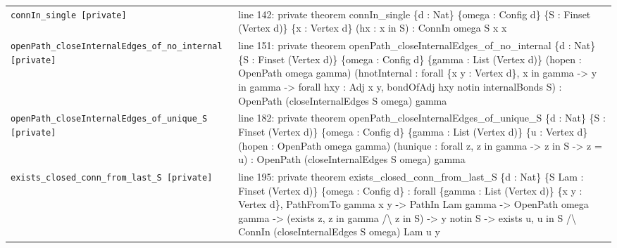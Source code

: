 \documentclass[10pt]{article}
\begin{document}
\begin{longtable}{>{\raggedright\arraybackslash}p{} >{\raggedright\arraybackslash}p{}}
\texttt{connIn\_\allowbreak{}single [private]} & {\ttfamily\scriptsize line 142:\allowbreak{} private theorem connIn\_\allowbreak{}single \{d :\allowbreak{} Nat\} \{omega :\allowbreak{} Config d\} \{S :\allowbreak{} Finset (\allowbreak{}Vertex d)\allowbreak{}\} \{x :\allowbreak{} Vertex d\} (\allowbreak{}hx :\allowbreak{} x in S)\allowbreak{} :\allowbreak{} ConnIn omega S x x} \\[0.45em]
\texttt{openPath\_\allowbreak{}closeInternalEdges\_\allowbreak{}of\_\allowbreak{}no\_\allowbreak{}internal [private]} & {\ttfamily\scriptsize line 151:\allowbreak{} private theorem openPath\_\allowbreak{}closeInternalEdges\_\allowbreak{}of\_\allowbreak{}no\_\allowbreak{}internal \{d :\allowbreak{} Nat\} \{S :\allowbreak{} Finset (\allowbreak{}Vertex d)\allowbreak{}\} \{omega :\allowbreak{} Config d\} \{gamma :\allowbreak{} List (\allowbreak{}Vertex d)\allowbreak{}\} (\allowbreak{}hopen :\allowbreak{} OpenPath omega gamma)\allowbreak{} (\allowbreak{}hnotInternal :\allowbreak{} forall \{x y :\allowbreak{} Vertex d\},\allowbreak{} x in gamma -\allowbreak{}> y in gamma -\allowbreak{}> forall hxy :\allowbreak{} Adj x y,\allowbreak{} bondOfAdj hxy notin internalBonds S)\allowbreak{} :\allowbreak{} OpenPath (\allowbreak{}closeInternalEdges S omega)\allowbreak{} gamma} \\[0.45em]
\texttt{openPath\_\allowbreak{}closeInternalEdges\_\allowbreak{}of\_\allowbreak{}unique\_\allowbreak{}S [private]} & {\ttfamily\scriptsize line 182:\allowbreak{} private theorem openPath\_\allowbreak{}closeInternalEdges\_\allowbreak{}of\_\allowbreak{}unique\_\allowbreak{}S \{d :\allowbreak{} Nat\} \{S :\allowbreak{} Finset (\allowbreak{}Vertex d)\allowbreak{}\} \{omega :\allowbreak{} Config d\} \{gamma :\allowbreak{} List (\allowbreak{}Vertex d)\allowbreak{}\} \{u :\allowbreak{} Vertex d\} (\allowbreak{}hopen :\allowbreak{} OpenPath omega gamma)\allowbreak{} (\allowbreak{}hunique :\allowbreak{} forall z,\allowbreak{} z in gamma -\allowbreak{}> z in S -\allowbreak{}> z =\allowbreak{} u)\allowbreak{} :\allowbreak{} OpenPath (\allowbreak{}closeInternalEdges S omega)\allowbreak{} gamma} \\[0.45em]
\texttt{exists\_\allowbreak{}closed\_\allowbreak{}conn\_\allowbreak{}from\_\allowbreak{}last\_\allowbreak{}S [private]} & {\ttfamily\scriptsize line 195:\allowbreak{} private theorem exists\_\allowbreak{}closed\_\allowbreak{}conn\_\allowbreak{}from\_\allowbreak{}last\_\allowbreak{}S \{d :\allowbreak{} Nat\} \{S Lam :\allowbreak{} Finset (\allowbreak{}Vertex d)\allowbreak{}\} \{omega :\allowbreak{} Config d\} :\allowbreak{} forall \{gamma :\allowbreak{} List (\allowbreak{}Vertex d)\allowbreak{}\} \{x y :\allowbreak{} Vertex d\},\allowbreak{} PathFromTo gamma x y -\allowbreak{}> PathIn Lam gamma -\allowbreak{}> OpenPath omega gamma -\allowbreak{}> (\allowbreak{}exists z,\allowbreak{} z in gamma /\allowbreak{}\textbackslash{} z in S)\allowbreak{} -\allowbreak{}> y notin S -\allowbreak{}> exists u,\allowbreak{} u in S /\allowbreak{}\textbackslash{} ConnIn (\allowbreak{}closeInternalEdges S omega)\allowbreak{} Lam u y} \\[0.45em]

\end{longtable}
\end{document}
